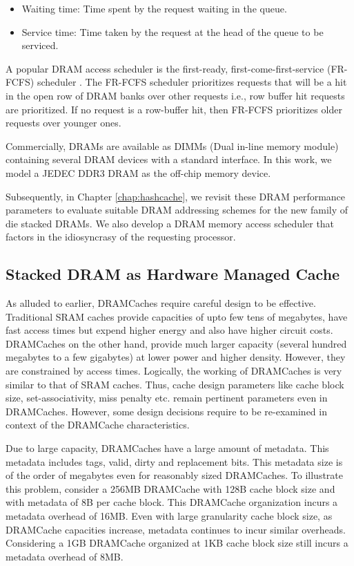 \begin{itemize}
	\item Waiting time: Time spent by the request waiting in the queue.
	\item Service time: Time taken by the request at the head of the queue to be serviced.
\end{itemize}
A popular DRAM access scheduler is the first-ready, first-come-first-service (FR-FCFS) scheduler \cite{frfcfs}. The FR-FCFS scheduler prioritizes requests that will be a hit in the open row of DRAM banks over other requests i.e., row buffer hit requests are prioritized. If no request is a row-buffer hit, then FR-FCFS prioritizes older requests over younger ones.

\par Commercially, DRAMs are available as DIMMs (Dual in-line memory module) containing several DRAM devices with a standard interface. In this work, we model a JEDEC DDR3 DRAM \cite{jedec-ddr3} as the off-chip memory device.
\par Subsequently, in Chapter \ref{chap:hashcache}, we revisit these DRAM performance parameters to evaluate suitable DRAM addressing schemes for the new family of die stacked DRAMs. We also develop a DRAM memory access scheduler that factors in the idiosyncrasy of the requesting processor.

\subsection{Stacked DRAM as Hardware Managed Cache} \label{dramcache-background}
As alluded to earlier, DRAMCaches require careful design to be effective. Traditional SRAM caches provide capacities of upto few tens of megabytes, have fast access times but expend higher energy and also have higher circuit costs. DRAMCaches on the other hand, provide much larger capacity (several hundred megabytes to a few gigabytes) at lower power and higher density. However, they are constrained by access times. 
Logically, the working of DRAMCaches is very similar to that of SRAM caches. Thus, cache design parameters like cache block size, set-associativity, miss penalty etc. remain pertinent parameters even in DRAMCaches.
However, some design decisions require to be re-examined in context of the DRAMCache characteristics.
\par Due to large capacity, DRAMCaches have a large amount of metadata. This metadata includes tags, valid, dirty and replacement bits. This metadata size is of the order of megabytes even for reasonably sized DRAMCaches. To illustrate this problem, consider a 256MB DRAMCache with 128B cache block size and with metadata of 8B per cache block. This DRAMCache organization incurs a metadata overhead of 16MB. Even with large granularity cache block size, as DRAMCache capacities increase, metadata continues to incur similar overheads. Considering a 1GB DRAMCache organized at 1KB cache block size still incurs a metadata overhead of 8MB.
